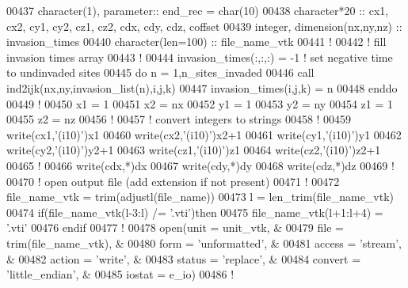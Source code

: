 \begin{DoxyCode}
00437 \textcolor{keywordtype}{character(1)}, \textcolor{keywordtype}{parameter}:: end\_rec = char(10)
00438 \textcolor{keywordtype}{character*20} :: cx1, cx2, cy1, cy2, cz1, cz2, cdx, cdy, cdz, coffset
00439 \textcolor{keywordtype}{integer}, \textcolor{keywordtype}{dimension(nx,ny,nz)} :: invasion\_times
00440 \textcolor{keywordtype}{character(len=100)} :: file\_name\_vtk
00441 \textcolor{comment}{!}
00442 \textcolor{comment}{! fill invasion times array}
00443 \textcolor{comment}{!}
00444 invasion\_times(:,:,:) = -1 \textcolor{comment}{! set negative time to undinvaded sites}
00445 \textcolor{keyword}{do} n = 1,n\_sites\_invaded
00446    call ind2ijk(nx,ny,invasion\_list(n),i,j,k)
00447    invasion\_times(i,j,k) = n
00448 \textcolor{keyword}{enddo}
00449 \textcolor{comment}{!}
00450 x1 = 1
00451 x2 = nx
00452 y1 = 1
00453 y2 = ny
00454 z1 = 1
00455 z2 = nz
00456 \textcolor{comment}{!}
00457 \textcolor{comment}{! convert integers to strings}
00458 \textcolor{comment}{!}
00459 \textcolor{keyword}{write}(cx1,\textcolor{stringliteral}{'(i10)'})x1
00460 \textcolor{keyword}{write}(cx2,\textcolor{stringliteral}{'(i10)'})x2+1
00461 \textcolor{keyword}{write}(cy1,\textcolor{stringliteral}{'(i10)'})y1
00462 \textcolor{keyword}{write}(cy2,\textcolor{stringliteral}{'(i10)'})y2+1
00463 \textcolor{keyword}{write}(cz1,\textcolor{stringliteral}{'(i10)'})z1
00464 \textcolor{keyword}{write}(cz2,\textcolor{stringliteral}{'(i10)'})z2+1
00465 \textcolor{comment}{!}
00466 \textcolor{keyword}{write}(cdx,*)dx
00467 \textcolor{keyword}{write}(cdy,*)dy
00468 \textcolor{keyword}{write}(cdz,*)dz
00469 \textcolor{comment}{!}
00470 \textcolor{comment}{! open output file (add extension if not present)}
00471 \textcolor{comment}{!}
00472 file\_name\_vtk = trim(adjustl(file\_name))
00473 l = len\_trim(file\_name\_vtk)
00474 \textcolor{keyword}{if}(file\_name\_vtk(l-3:l) /= \textcolor{stringliteral}{'.vti'})\textcolor{keyword}{then}
00475    file\_name\_vtk(l+1:l+4) = \textcolor{stringliteral}{'.vti'}
00476 \textcolor{keyword}{endif}
00477 \textcolor{comment}{!}
00478 \textcolor{keyword}{open}(unit       = unit\_vtk,            &
00479      file       = trim(file\_name\_vtk), &
00480      form       = \textcolor{stringliteral}{'unformatted'},       &
00481      access     = \textcolor{stringliteral}{'stream'},            &
00482      action     = \textcolor{stringliteral}{'write'},             &
00483      status     = \textcolor{stringliteral}{'replace'},           &
00484      convert    = \textcolor{stringliteral}{'little\_endian'},     &
00485      iostat     = e\_io)
00486 \textcolor{comment}{!}

\end{DoxyCode}
